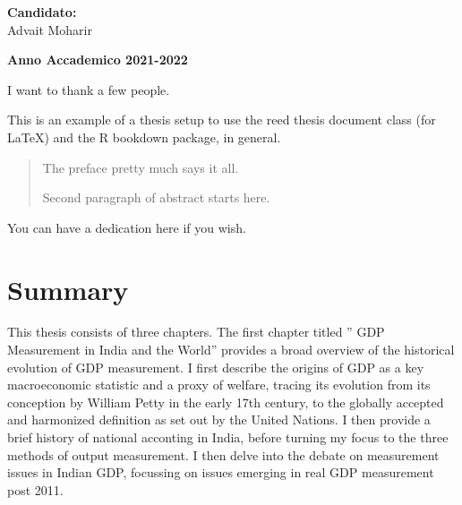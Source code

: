 \documentclass[12pt,nobind, a4paper]{reedthesis}
\begin{document}
	\hfill
	\begin{minipage}[t]{0.47\textwidth}\raggedleft
		{\large{\textbf{Candidato:}\\
				Advait Moharir}}
	\end{minipage}
	\vspace{2mm} %
	\begin{center}
		{\large{\bf Anno Accademico 2021-2022}}
	\end{center}
	\frontmatter %
	\pagestyle{empty} %
		\begin{acknowledgements}
		I want to thank a few people.
	\end{acknowledgements}
		\begin{preface}
		This is an example of a thesis setup to use the reed thesis document class
  (for LaTeX) and the R bookdown package, in general.
	\end{preface}
		\hypersetup{linkcolor=blue}
	\setcounter{secnumdepth}{2}
	\setcounter{tocdepth}{2}
	\tableofcontents
		
		\listoftables
		
		\listoffigures
		\begin{abstract}
		The preface pretty much says it all.

  \par

  Second paragraph of abstract starts here.
	\end{abstract}
		\begin{dedication}
		You can have a dedication here if you wish.
	\end{dedication}
	\mainmatter %
	\pagestyle{fancyplain} %
	
	\hypertarget{summary}{%
 \chapter*{Summary}\label{summary}}

 This thesis consists of three chapters. The first chapter titled '' GDP Measurement in India and the World'' provides a broad overview of the historical evolution of GDP measurement. I first describe the origins of GDP as a key macroeconomic statistic and a proxy of welfare, tracing its evolution from its conception by William Petty in the early 17th century, to the globally accepted and harmonized definition as set out by the United Nations. I then provide a brief history of national acconting in India, before turning my focus to the three methods of output measurement. I then delve into the debate on measurement issues in Indian GDP, focussing on issues emerging in real GDP measurement post 2011.
 \linebreak
\end{document}
